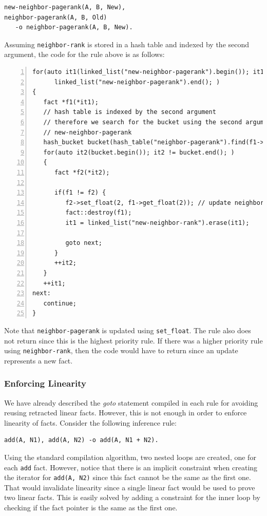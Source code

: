 \begin{Verbatim}[fontsize=\scriptsize]
new-neighbor-pagerank(A, B, New),
neighbor-pagerank(A, B, Old)
   -o neighbor-pagerank(A, B, New).
\end{Verbatim}

Assuming \texttt{neighbor-rank} is stored in a hash table and indexed by the
second argument, the code for the rule above is as follows:

\begin{Verbatim}[numbers=left,fontsize=\scriptsize]
for(auto it1(linked_list("new-neighbor-pagerank").begin()); it1 !=
      linked_list("new-neighbor-pagerank").end(); )
{
   fact *f1(*it1);
   // hash table is indexed by the second argument
   // therefore we search for the bucket using the second argument of
   // new-neighbor-pagerank
   hash_bucket bucket(hash_table("neighbor-pagerank").find(f1->get_node(1));
   for(auto it2(bucket.begin()); it2 != bucket.end(); )
   {
      fact *f2(*it2);

      if(f1 != f2) {
         f2->set_float(2, f1->get_float(2)); // update neighbor-pagerank
         fact::destroy(f1);
         it1 = linked_list("new-neighbor-rank").erase(it1);

         goto next;
      }
      ++it2;
   }
   ++it1;
next:
   continue;
}
\end{Verbatim}

Note that \texttt{neighbor-pagerank} is updated using \texttt{set\_float}. The
rule also does not return since this is the highest priority rule. If there
was a higher priority rule using \texttt{neighbor-rank}, then the code
would have to return since an update represents a new fact.

\subsubsection{Enforcing Linearity}

We have already described the \emph{goto} statement compiled in each rule for avoiding
reusing retracted linear facts. However, this is not enough in order to enforce
linearity of facts. Consider the following inference rule:

\begin{Verbatim}
add(A, N1), add(A, N2) -o add(A, N1 + N2).
\end{Verbatim}

Using the standard compilation algorithm, two nested loops are created, one for
each \texttt{add} fact. However, notice that there is an implicit constraint
when creating the iterator for \texttt{add(A, N2)} since this fact cannot be the
same as the first one. That would invalidate linearity since a single linear fact would
be used to prove two linear facts. This is easily solved by adding a constraint
for the inner loop by checking if the fact pointer is the same as the first one.

